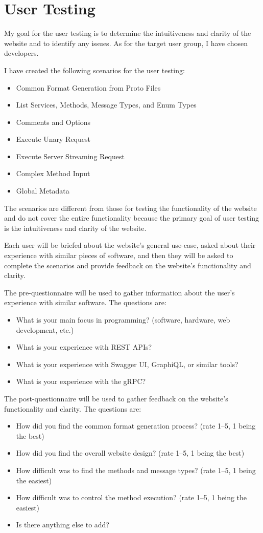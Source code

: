 \section{User Testing}
My goal for the user testing is to determine the intuitiveness and clarity of the website and to identify any issues.
As for the target user group, I have chosen developers.

I have created the following scenarios for the user testing:
\begin{itemize}
    \item Common Format Generation from Proto Files
    \item List Services, Methods, Message Types, and Enum Types
    \item Comments and Options
    \item Execute Unary Request
    \item Execute Server Streaming Request
    \item Complex Method Input
    \item Global Metadata
\end{itemize}

The scenarios are different from those for testing the functionality of the website
and do not cover the entire functionality
because the primary goal of user testing is the intuitiveness and clarity of the website.

Each user will be briefed about the website's general use-case,
asked about their experience with similar pieces of software,
and then they will be asked to complete the scenarios
and provide feedback on the website's functionality and clarity.

The pre-questionnaire will be used to gather information about the user's experience with similar software.
The questions are:
\begin{itemize}
    \item What is your main focus in programming?
    (software, hardware, web development, etc.)
    \item What is your experience with REST APIs?
    \item What is your experience with Swagger UI, GraphiQL, or similar tools?
    \item What is your experience with the gRPC?
\end{itemize}

The post-questionnaire will be used to gather feedback on the website's functionality and clarity.
The questions are:
\begin{itemize}
    \item How did you find the common format generation process?
    (rate 1--5, 1 being the best)
    \item How did you find the overall website design?
    (rate 1--5, 1 being the best)
    \item How difficult was to find the methods and message types?
    (rate 1--5, 1 being the easiest)
    \item How difficult was to control the method execution?
    (rate 1--5, 1 being the easiest)
    \item Is there anything else to add?
\end{itemize}

